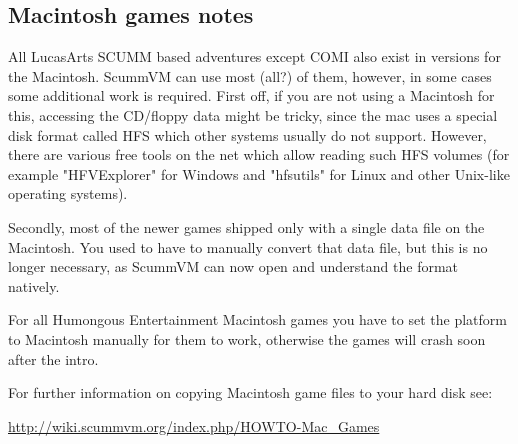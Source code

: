 \subsection{Macintosh games notes}

All LucasArts SCUMM based adventures except COMI also exist in versions for the
Macintosh. ScummVM can use most (all?) of them, however, in some cases some
additional work is required. First off, if you are not using a Macintosh for
this, accessing the CD/floppy data might be tricky, since the mac uses a
special disk format called HFS which other systems usually do not support.
However, there are various free tools on the net which allow reading such HFS
volumes (for example "HFVExplorer" for Windows and "hfsutils" for Linux and
other Unix-like operating systems).

Secondly, most of the newer games shipped only with a  single data file on the
Macintosh. You used to have to manually convert that data file, but this is no
longer necessary, as ScummVM can now open and understand the format natively.

For all Humongous Entertainment Macintosh games you have to set the platform
to Macintosh manually for them to work, otherwise the games will crash soon
after the intro.

For further information on copying Macintosh game files to your hard disk see:

  \url{http://wiki.scummvm.org/index.php/HOWTO-Mac_Games}


